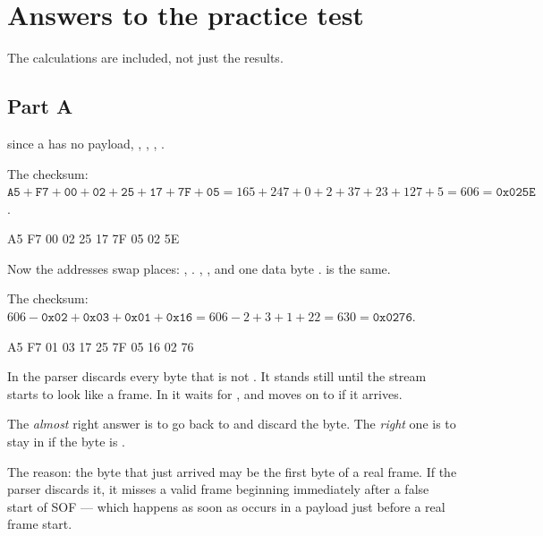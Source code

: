 \chapter{Answers to the practice test}
\label{ch:ovningssvar}

The calculations are included, not just the results.

\section*{Part A}

  since a  has no payload, ,
, , .

The checksum: $\mathtt{A5} + \mathtt{F7} + \mathtt{00} + \mathtt{02} + \mathtt{25} + \mathtt{17} +
\mathtt{7F} + \mathtt{05} = 165 + 247 + 0 + 2 + 37 + 23 + 127 + 5 = 606 = \mathtt{0x025E}$.

\begin{console}
A5 F7 00 02 25 17 7F 05 02 5E
\end{console}

 Now the addresses swap places: , . ,
, and one data byte .  is the same.

The checksum: $606 - \mathtt{0x02} + \mathtt{0x03} + \mathtt{0x01} + \mathtt{0x16} =
606 - 2 + 3 + 1 + 22 = 630 = \mathtt{0x0276}$.

\begin{console}
A5 F7 01 03 17 25 7F 05 16 02 76
\end{console}

 In  the parser discards every byte that is not . It stands
still until the stream starts to look like a frame. In  it waits for
, and moves on to  if it arrives.

 The \emph{almost} right answer is to go back to  and discard the byte.
The \emph{right} one is to stay in  if the byte is .

The reason: the byte that just arrived may be the first byte of a real frame. If the parser
discards it, it misses a valid frame beginning immediately after a false start of SOF --- which
happens as soon as  occurs in a payload just before a real frame start.

